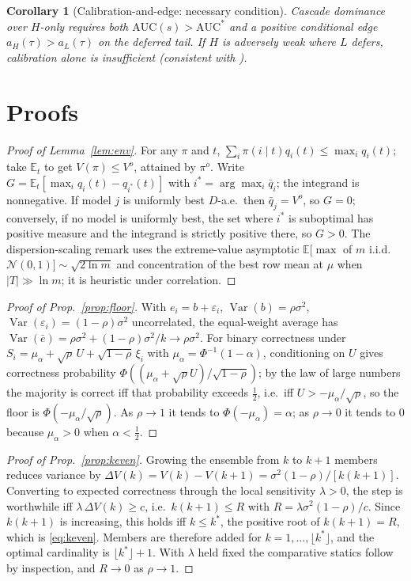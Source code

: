 \documentclass[11pt]{article}
\theoremstyle{plain}
\newtheorem{corollary}{Corollary}
\theoremstyle{definition}
\newcommand{\E}{\mathbb{E}}
\newcommand{\Var}{\operatorname{Var}}
\begin{document}
\begin{corollary}[Calibration-and-edge: necessary condition]\label{cor:edge}
Cascade dominance over $H$-only requires both $\mathrm{AUC}(s)>\mathrm{AUC}^\ast$ and a positive conditional edge
$a_H(\tau)>a_L(\tau)$ on the deferred tail. If $H$ is adversely weak where $L$ defers, calibration alone is insufficient
(consistent with \citealp{jitkrittum2023cascade}).
\end{corollary}


\section{Proofs}\label{app:proofs}
\begin{proof}[Proof of Lemma~\ref{lem:env}]
For any $\pi$ and $t$, $\sum_i\pi(i\mid t)q_i(t)\le\max_i q_i(t)$; take $\E_t$ to get $V(\pi)\le V^o$, attained by $\pi^o$. Write
$G=\E_t[\max_i q_i(t)-q_{i^\ast}(t)]$ with $i^\ast=\arg\max_i\bar q_i$; the integrand is nonnegative. If model $j$ is uniformly best
$D$-a.e.\ then $\bar q_j=V^o$, so $G=0$; conversely, if no model is uniformly best, the set where $i^\ast$ is suboptimal has positive
measure and the integrand is strictly positive there, so $G>0$. The dispersion-scaling remark uses the extreme-value asymptotic
$\E[\max$ of $m$ i.i.d.\ $\mathcal N(0,1)]\sim\sqrt{2\ln m}$ and concentration of the best row mean at $\mu$ when $|T|\gg\ln m$; it is
heuristic under correlation.
\end{proof}
\begin{proof}[Proof of Prop.~\ref{prop:floor}]
With $e_i=b+\varepsilon_i$, $\Var(b)=\rho\sigma^2$, $\Var(\varepsilon_i)=(1-\rho)\sigma^2$ uncorrelated, the equal-weight average has
$\Var(\bar e)=\rho\sigma^2+(1-\rho)\sigma^2/k\to\rho\sigma^2$. For binary correctness under $S_i=\mu_\alpha+\sqrt\rho\,U+\sqrt{1-\rho}\,\xi_i$ with
$\mu_\alpha=\Phi^{-1}(1-\alpha)$, conditioning on $U$ gives correctness probability $\Phi((\mu_\alpha+\sqrt\rho U)/\sqrt{1-\rho})$; by the law of large
numbers the majority is correct iff that probability exceeds $\tfrac12$, i.e.\ iff $U>-\mu_\alpha/\sqrt\rho$, so the floor is
$\Phi(-\mu_\alpha/\sqrt\rho)$. As $\rho\to1$ it tends to $\Phi(-\mu_\alpha)=\alpha$; as $\rho\to0$ it tends to $0$ because $\mu_\alpha>0$ when $\alpha<\tfrac12$.
\end{proof}
\begin{proof}[Proof of Prop.~\ref{prop:keven}]
Growing the ensemble from $k$ to $k{+}1$ members reduces variance by $\Delta V(k)=V(k)-V(k{+}1)=\sigma^2(1-\rho)/[k(k+1)]$. Converting to expected correctness
through the local sensitivity $\lambda>0$, the step is worthwhile iff $\lambda\,\Delta V(k)\ge c$, i.e.\ $k(k+1)\le R$ with
$R=\lambda\sigma^2(1-\rho)/c$. Since $k(k+1)$ is increasing, this holds iff $k\le k^\ast$, the positive root of $k(k+1)=R$, which is
\eqref{eq:keven}. Members are therefore added for $k=1,\dots,\lfloor k^\ast\rfloor$, and the optimal cardinality is $\lfloor k^\ast\rfloor+1$.
With $\lambda$ held fixed the comparative statics follow by inspection, and $R\to0$ as $\rho\to1$.
\end{proof}
\end{document}

